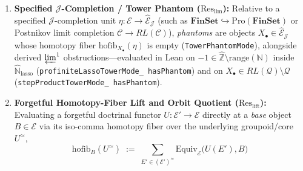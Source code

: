 \begin{proposition}
\begin{enumerate}
\begin{itemize}
    \item \emph{Transcendent (external global-section) splitting:} given in the slice $\mathcal{E}/Y$ by $\|\Gamma_{\mathcal{E}/Y}(\Pi_f(p))\|_{-1} \simeq 1_{\mathbf{Set}}$ (where $\Gamma_{\mathcal{E}/Y}(\Pi_f(p)) := \mathrm{Hom}_{\mathcal{E}/Y}(1_{\mathcal{E}/Y}, \Pi_f(p)) \cong \mathrm{Sect}_{\mathcal{E}}(p)$ coincides with global sections $\mathrm{Sect}_{\mathcal{E}}(p)$ of $p : E \twoheadrightarrow X$, and with $\Gamma(E)$ when $X = Y = 1_{\mathcal{E}}$ and $p : E \twoheadrightarrow 1_{\mathcal{E}}$), which characterizes $\mathrm{EAC}$ and detects $\Gamma(\mathcal{T}_{\mathrm{odd}}) = \emptyset$ in $\mathbf{Nom}$ and $\Gamma(\mathbb{Z}/2\mathbb{Z}) = \emptyset$ in $\mathbf{Set}^{\mathbb{Z}/2\mathbb{Z}}$.
  \end{itemize}
  Furthermore, $(-1)$-connected inhabitation is strictly weaker than $(-2)$-contractibility: for $q : \mathbb{Z} \twoheadrightarrow \mathbb{Z}/2\mathbb{Z}$, the set-level section space is non-trivial (\texttt{intToZMod2TypeMode\_ sectionSpace\_ nontrivial}) and therefore inhabited yet not contractible (\texttt{not\_ intToZMod2TypeMode\_ contractible}), whereas its abelian group section fiber is empty (\texttt{isEmpty\_ intToZMod2AbMode\_ sectionSpace}).
  \item \textbf{Specified $\mathcal{J}$-Completion / Tower Phantom ($\mathrm{Res}_{\mathrm{lim}}$):} Relative to a specified $\mathcal{J}$-completion unit $\eta : \mathcal{E} \to \widehat{\mathcal{E}}_{\mathcal{J}}$ (such as $\mathbf{FinSet} \hookrightarrow \mathrm{Pro}(\mathbf{FinSet})$ or Postnikov limit completion $\mathcal{C} \to RL(\mathcal{C})$), \emph{phantoms} are objects $X_\bullet \in \widehat{\mathcal{E}}_{\mathcal{J}}$ whose homotopy fiber $\mathrm{hofib}_{X_\bullet}(\eta)$ is empty (\texttt{TowerPhantomMode}), alongside derived $\varprojlim^1$ obstructions---evaluated in Lean on $-1 \in \widehat{\mathbb{Z}} \setminus \mathrm{range}(\mathbb{N})$ inside $\widehat{\mathbb{N}}_{\mathrm{lasso}}$ (\texttt{profiniteLassoTowerMode\_ hasPhantom}) and on $X_\bullet \in RL(\mathcal{Q}) \setminus \mathcal{Q}$ (\texttt{stepProductTowerMode\_ hasPhantom}).
  \item \textbf{Forgetful Homotopy-Fiber Lift and Orbit Quotient ($\mathrm{Res}_{\mathrm{lift}}$):} Evaluating a forgetful doctrinal functor $U : \mathcal{E}' \to \mathcal{E}$ directly at a \emph{base} object $B \in \mathcal{E}$ via its iso-comma homotopy fiber over the underlying groupoid/core $U^{\simeq}$,
  \[
    \mathrm{hofib}_B(U^{\simeq}) \;:=\; \sum_{E' \in (\mathcal{E}')^{\simeq}} \mathrm{Equiv}_{\mathcal{E}}\bigl(U(E'), B\bigr)
\]
\end{enumerate}
\end{proposition}
